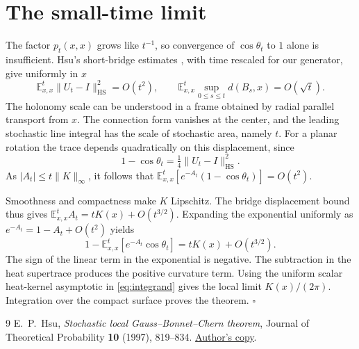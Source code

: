 \documentclass[11pt]{article}
\newcommand{\E}{\mathbb E^t_{x,x}}
\begin{document}
\section{The small-time limit}
The factor $p_t(x,x)$ grows like $t^{-1}$, so convergence of
$\cos\theta_t$ to $1$ alone is insufficient. Hsu's short-bridge estimates
\cite[Prop.~2 and Sec.~6]{hsu}, with time rescaled for our generator,
give uniformly in $x$
\[
   \E\|U_t-I\|_{\mathrm{HS}}^2=O(t^2),\qquad
   \E\sup_{0\le s\le t}d(B_s,x)=O(\sqrt t).
\]
The holonomy scale can be understood in a frame obtained by radial
parallel transport from $x$. The connection form vanishes at the
center, and the leading stochastic line integral has the scale of
stochastic area, namely $t$. For a planar rotation the trace depends
quadratically on this displacement, since
\[
    1-\cos\theta_t=\tfrac14\|U_t-I\|_{\mathrm{HS}}^2.
\]
As $|A_t|\le t\|K\|_\infty$, it follows that
$\E[e^{-A_t}(1-\cos\theta_t)]=O(t^2)$.

Smoothness and compactness make $K$ Lipschitz. The bridge displacement
bound thus gives $\E A_t=tK(x)+O(t^{3/2})$. Expanding the exponential
uniformly as $e^{-A_t}=1-A_t+O(t^2)$ yields
\[
  1-\E[e^{-A_t}\cos\theta_t]=tK(x)+O(t^{3/2}).
\]
The sign of the linear term in the exponential is negative. The
subtraction in the heat supertrace produces the positive curvature
term. Using the uniform scalar heat-kernel asymptotic in
\eqref{eq:integrand} gives the local limit $K(x)/(2\pi)$. Integration
over the compact surface proves the theorem. \hfill$\square$

\begin{thebibliography}{9}
 E.~P.~Hsu, \emph{Stochastic local Gauss--Bonnet--Chern theorem},
Journal of Theoretical Probability \textbf{10} (1997), 819--834.
\href{https://sites.math.northwestern.edu/~ehsu/Stochastic\%20Local\%20Gauss-Bonnet-Chern\%20Theorem.pdf}{Author's copy}.
\end{thebibliography}
\end{document}
